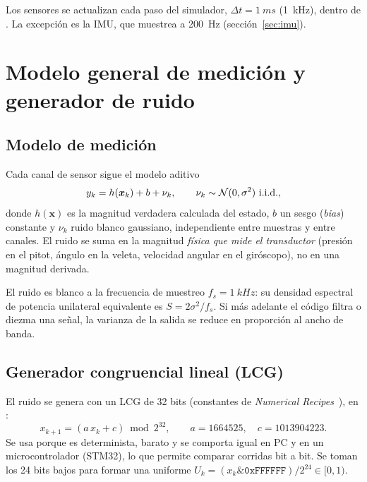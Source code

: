 \documentclass[11pt,a4paper]{article}
\begin{document}
Los sensores se actualizan cada paso del simulador, $\Delta t = \SI{1}{ms}$
(\SI{1}{kHz}), dentro de . La excepción es la IMU, que
muestrea a \SI{200}{Hz} (sección~\ref{sec:imu}).

\section{Modelo general de medición y generador de ruido}
\label{sec:ruido}

\subsection{Modelo de medición}

Cada canal de sensor sigue el modelo aditivo
\begin{equation}
  y_k = h(\bm{x}_k) + b + \nu_k, \qquad \nu_k \sim \mathcal{N}(0,\sigma^2)
  \ \text{i.i.d.},
  \label{eq:medicion}
\end{equation}
donde $h(\bm{x})$ es la magnitud verdadera calculada del estado, $b$ un sesgo
(\emph{bias}) constante y $\nu_k$ ruido blanco gaussiano, independiente entre
muestras y entre canales. El ruido se suma en la magnitud \emph{física que mide
el transductor} (presión en el pitot, ángulo en la veleta, velocidad angular en
el giróscopo), no en una magnitud derivada.

El ruido es blanco a la frecuencia de muestreo $f_s = \SI{1}{kHz}$: su densidad
espectral de potencia unilateral equivalente es $S = 2\sigma^2/f_s$. Si más
adelante el código filtra o diezma una señal, la varianza de la salida se
reduce en proporción al ancho de banda.

\subsection{Generador congruencial lineal (LCG)}

El ruido se genera con un LCG de 32 bits (constantes de
\emph{Numerical Recipes}~\cite{press}), en :
\begin{equation}
  x_{k+1} = (a\,x_k + c) \bmod 2^{32}, \qquad a = 1664525,\quad c = 1013904223 .
\end{equation}
Se usa porque es determinista, barato y se comporta igual en PC y en un
microcontrolador (STM32), lo que permite comparar corridas bit a bit. Se toman
los 24 bits bajos para formar una uniforme $U_k = (x_k \mathbin{\&} \texttt{0xFFFFFF})/2^{24}
\in [0,1)$.
\end{document}
